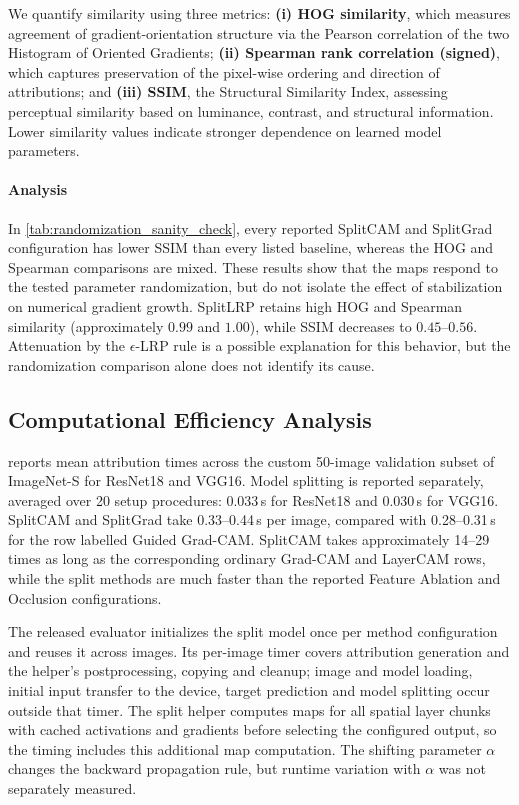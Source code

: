 We quantify similarity using three metrics:
\textbf{(i) HOG similarity}, which measures agreement of gradient-orientation structure via the Pearson correlation of the two Histogram of Oriented Gradients; 
\textbf{(ii) Spearman rank correlation (signed)}, which captures preservation of the pixel-wise 
ordering and direction of attributions; and 
\textbf{(iii) SSIM}, the Structural Similarity Index, assessing perceptual similarity based on 
luminance, contrast, and structural information. 
Lower similarity values indicate stronger dependence on learned model parameters.



\paragraph{Analysis}
In \cref{tab:randomization_sanity_check}, every reported SplitCAM and SplitGrad configuration has lower SSIM than every listed baseline, whereas the HOG and Spearman comparisons are mixed. These results show that the maps respond to the tested parameter randomization, but do not isolate the effect of stabilization on numerical gradient growth. SplitLRP retains high HOG and Spearman similarity (approximately $0.99$ and $1.00$), while SSIM decreases to $0.45$--$0.56$. Attenuation by the $\epsilon$-LRP rule is a possible explanation for this behavior, but the randomization comparison alone does not identify its cause.

\subsection{Computational Efficiency Analysis} \label{app:timing}

 reports mean attribution times across the custom 50-image validation subset of ImageNet-S for ResNet18 and VGG16. Model splitting is reported separately, averaged over 20 setup procedures: 0.033\,s for ResNet18 and 0.030\,s for VGG16. SplitCAM and SplitGrad take 0.33--0.44\,s per image, compared with 0.28--0.31\,s for the row labelled Guided Grad-CAM. SplitCAM takes approximately 14--29 times as long as the corresponding ordinary Grad-CAM and LayerCAM rows, while the split methods are much faster than the reported Feature Ablation and Occlusion configurations.

The released evaluator initializes the split model once per method configuration and reuses it across images. Its per-image timer covers attribution generation and the helper's postprocessing, copying and cleanup; image and model loading, initial input transfer to the device, target prediction and model splitting occur outside that timer. The split helper computes maps for all spatial layer chunks with cached activations and gradients before selecting the configured output, so the timing includes this additional map computation. The shifting parameter $\alpha$ changes the backward propagation rule, but runtime variation with $\alpha$ was not separately measured.

